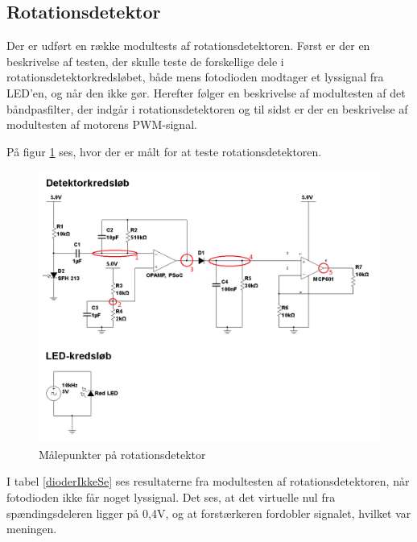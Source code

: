 \subsection{Rotationsdetektor}
Der er udført en række modultests af rotationsdetektoren. Først er der en beskrivelse af testen, der skulle teste de forskellige dele i rotationsdetektorkredsløbet, både mens fotodioden modtager et lyssignal fra LED'en, og når den ikke gør. Herefter følger en beskrivelse af modultesten af det båndpasfilter, der indgår i rotationsdetektoren og til sidst er der en beskrivelse af modultesten af motorens PWM-signal. 

På figur \ref{fig:målepunkter} ses, hvor der er målt for at teste rotationsdetektoren. 

\begin{figure}[H]
	\centering
	\includegraphics[width=\textwidth]{Test/images/rotationsdetektor_maalepunkter}
	\caption{Målepunkter på rotationsdetektor}
	\label{fig:målepunkter}
\end{figure}

I tabel \ref{dioderIkkeSe} ses resultaterne fra modultesten af rotationsdetektoren, når fotodioden ikke får noget lyssignal. Det ses, at det virtuelle nul fra spændingsdeleren ligger på 0,4V, og at forstærkeren fordobler signalet, hvilket var meningen. 

